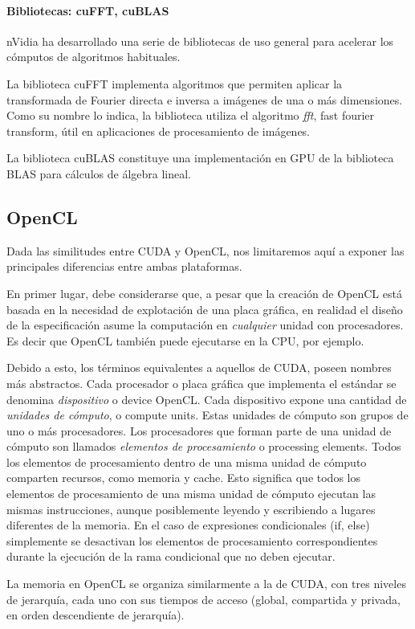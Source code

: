 \paragraph{Bibliotecas: cuFFT, cuBLAS}
nVidia ha desarrollado una serie de bibliotecas de uso general para acelerar los cómputos de algoritmos habituales.

La biblioteca cuFFT implementa algoritmos que permiten aplicar la transformada de Fourier directa e inversa a im\'agenes de una o m\'as dimensiones.
Como su nombre lo indica, la biblioteca utiliza el algoritmo {\em fft}, fast fourier transform, útil en aplicaciones de procesamiento de imágenes.

La biblioteca cuBLAS constituye una implementación en GPU de la biblioteca BLAS para cálculos de álgebra lineal.


\subsection{OpenCL}
Dada las similitudes entre CUDA y OpenCL, nos limitaremos aquí a exponer las principales diferencias entre ambas plataformas.

En primer lugar, debe considerarse que, a pesar que la creación de OpenCL está basada en la necesidad de explotación de una placa gráfica, en realidad el diseño de la especificación asume la computación en {\em cualquier} unidad con procesadores.
Es decir que OpenCL también puede ejecutarse en la CPU, por ejemplo.

Debido a esto, los términos equivalentes a aquellos de CUDA, poseen nombres más abstractos.
Cada procesador o placa gráfica que implementa el estándar se denomina {\em dispositivo} o device OpenCL. Cada dispositivo expone una cantidad de {\em unidades de cómputo}, o compute units. Estas unidades de cómputo son grupos de uno o más procesadores.
Los procesadores que forman parte de una unidad de cómputo son llamados {\em elementos
de procesamiento} o processing elements.
Todos los elementos de procesamiento dentro de una misma unidad de cómputo comparten recursos, como memoria y cache.
Esto significa que todos los elementos de procesamiento de una misma unidad de cómputo ejecutan las mismas instrucciones, aunque posiblemente leyendo y escribiendo a lugares diferentes de la memoria. En el caso de expresiones condicionales (if, else) simplemente se desactivan los elementos de procesamiento correspondientes durante la ejecución de la rama condicional que no deben ejecutar.

La memoria en OpenCL se organiza similarmente a la de CUDA, con tres niveles de jerarquía, cada uno con sus tiempos de acceso (global, compartida y privada, en orden descendiente de jerarquía).

